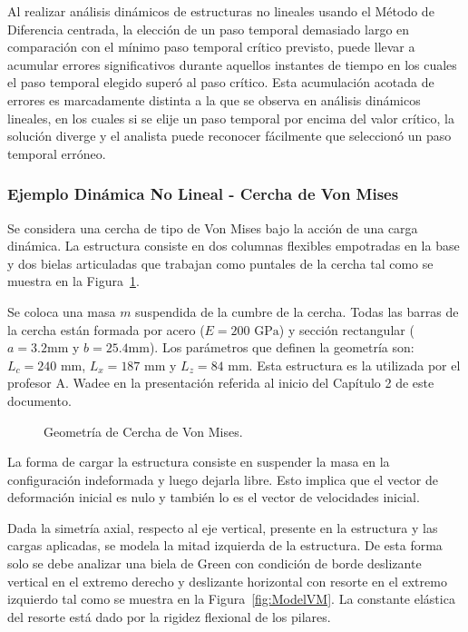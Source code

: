 Al realizar análisis dinámicos de estructuras no lineales usando el Método de Diferencia centrada, la elección de un paso temporal demasiado largo en comparación con el mínimo paso temporal crítico previsto, puede llevar a acumular errores significativos durante aquellos instantes de tiempo en los cuales el paso temporal elegido superó al paso crítico. %
%
Esta acumulación acotada de errores es marcadamente distinta a la que se observa en análisis dinámicos lineales, en los cuales si se elije un paso temporal por encima del valor crítico, la solución diverge y el analista puede reconocer fácilmente que seleccionó un paso temporal erróneo.


\subsubsection{Ejemplo Dinámica No Lineal - Cercha de Von Mises}

Se considera una cercha de tipo de Von Mises bajo la acción de una carga dinámica. %
%
La estructura consiste en dos columnas flexibles empotradas en la base y dos bielas articuladas que trabajan como puntales de la cercha tal como se muestra en la Figura~\ref{fig:GeomVM}. %

Se coloca una masa $m$ suspendida de la cumbre de la cercha. %
%
Todas las barras de la cercha están formada por acero ($E=200 \text{ GPa}$) y sección rectangular ($a=3.2\text{mm}$ y $b=25.4\text{mm}$). %
%
Los parámetros que definen la geometría son: $L_c = 240 $ mm, $L_x= 187$ mm y $L_z=84$ mm. %
%
Esta estructura es la utilizada por el profesor A. Wadee en la presentación referida al inicio del Capítulo 2 de este documento.

\begin{figure}[htb]
	\centering
	\def\svgwidth{0.7\textwidth}

	\caption{Geometría de Cercha de Von Mises.}
	\label{fig:GeomVM}
\end{figure}

La forma de cargar la estructura consiste en suspender la masa en la configuración indeformada y luego dejarla libre. Esto implica que el vector de deformación inicial es nulo y también lo es el vector de velocidades inicial.

Dada la simetría axial, respecto al eje vertical, presente en la estructura y las cargas aplicadas, se modela la mitad izquierda de la estructura. %
%
De esta forma solo se debe analizar una biela de Green con condición de borde deslizante vertical en el extremo derecho y deslizante horizontal con resorte en el extremo izquierdo tal como se muestra en la Figura~\ref{fig:ModelVM}. %
%
La constante elástica del resorte está dado por la rigidez flexional de los pilares.

